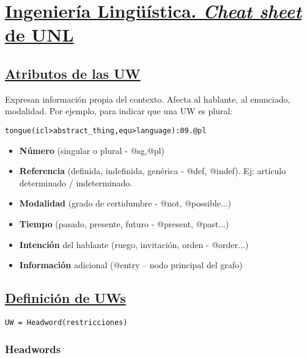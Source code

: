 \documentclass{article}
\begin{document}
\section*{\huge{\underline{Ingeniería Lingüística. \emph{Cheat sheet} de UNL}}}

\begin{multicols*}{3}

\subsection*{\underline{Atributos de las UW}}

Expresan información propia del contexto. Afecta al hablante, al enunciado, modalidad. Por ejemplo, para indicar que una UW es plural:

\begin{verbatim}
tongue(icl>abstract_thing,equ>language):09.@pl
\end{verbatim}

\begin{itemize}[itemsep=0pt, parsep=0pt, leftmargin=1em]
    \item \textbf{Número} (singular o plural - @sg,@pl)
    \item \textbf{Referencia} (definida, indefinida, genérica - @def, @indef). Ej: artículo determinado / indeterminado.
    \item \textbf{Modalidad} (grado de certidumbre - @not, @possible...)
    \item \textbf{Tiempo} (pasado, presente, futuro - @present, @past...)
    \item \textbf{Intención} del hablante (ruego, invitación, orden - @order...)
    \item \textbf{Información} adicional (@entry – nodo principal del grafo)
\end{itemize}

\subsection*{\underline{Definición de UWs}}

\begin{verbatim}
UW = Headword(restricciones)
\end{verbatim}

\subsubsection*{Headwords}


\end{multicols*}
\end{document}
